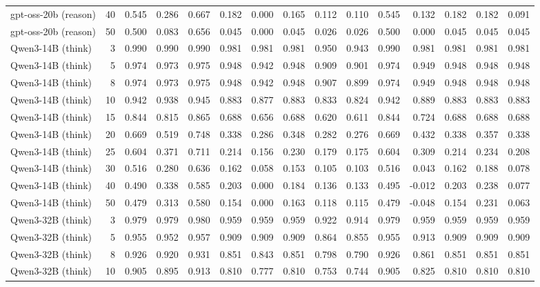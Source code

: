 \documentclass[acmsmall,screen,review,anonymous]{acmart}
\begin{document}
\begin{landscape}
\begin{longtable}{p{4.1cm}r*{13}{r}}
gpt-oss-20b (reason) & 40 & 0.545 & 0.286 & 0.667 & 0.182 & 0.000 & 0.165 & 0.112 & 0.110 & 0.545 & 0.132 & 0.182 & 0.182 & 0.091 \\
gpt-oss-20b (reason) & 50 & 0.500 & 0.083 & 0.656 & 0.045 & 0.000 & 0.045 & 0.026 & 0.026 & 0.500 & 0.000 & 0.045 & 0.045 & 0.045 \\
Qwen3-14B (think) & 3 & 0.990 & 0.990 & 0.990 & 0.981 & 0.981 & 0.981 & 0.950 & 0.943 & 0.990 & 0.981 & 0.981 & 0.981 & 0.981 \\
Qwen3-14B (think) & 5 & 0.974 & 0.973 & 0.975 & 0.948 & 0.942 & 0.948 & 0.909 & 0.901 & 0.974 & 0.949 & 0.948 & 0.948 & 0.948 \\
Qwen3-14B (think) & 8 & 0.974 & 0.973 & 0.975 & 0.948 & 0.942 & 0.948 & 0.907 & 0.899 & 0.974 & 0.949 & 0.948 & 0.948 & 0.948 \\
Qwen3-14B (think) & 10 & 0.942 & 0.938 & 0.945 & 0.883 & 0.877 & 0.883 & 0.833 & 0.824 & 0.942 & 0.889 & 0.883 & 0.883 & 0.883 \\
Qwen3-14B (think) & 15 & 0.844 & 0.815 & 0.865 & 0.688 & 0.656 & 0.688 & 0.620 & 0.611 & 0.844 & 0.724 & 0.688 & 0.688 & 0.688 \\
Qwen3-14B (think) & 20 & 0.669 & 0.519 & 0.748 & 0.338 & 0.286 & 0.348 & 0.282 & 0.276 & 0.669 & 0.432 & 0.338 & 0.357 & 0.338 \\
Qwen3-14B (think) & 25 & 0.604 & 0.371 & 0.711 & 0.214 & 0.156 & 0.230 & 0.179 & 0.175 & 0.604 & 0.309 & 0.214 & 0.234 & 0.208 \\
Qwen3-14B (think) & 30 & 0.516 & 0.280 & 0.636 & 0.162 & 0.058 & 0.153 & 0.105 & 0.103 & 0.516 & 0.043 & 0.162 & 0.188 & 0.078 \\
Qwen3-14B (think) & 40 & 0.490 & 0.338 & 0.585 & 0.203 & 0.000 & 0.184 & 0.136 & 0.133 & 0.495 & -0.012 & 0.203 & 0.238 & 0.077 \\
Qwen3-14B (think) & 50 & 0.479 & 0.313 & 0.580 & 0.154 & 0.000 & 0.163 & 0.118 & 0.115 & 0.479 & -0.048 & 0.154 & 0.231 & 0.063 \\
Qwen3-32B (think) & 3 & 0.979 & 0.979 & 0.980 & 0.959 & 0.959 & 0.959 & 0.922 & 0.914 & 0.979 & 0.959 & 0.959 & 0.959 & 0.959 \\
Qwen3-32B (think) & 5 & 0.955 & 0.952 & 0.957 & 0.909 & 0.909 & 0.909 & 0.864 & 0.855 & 0.955 & 0.913 & 0.909 & 0.909 & 0.909 \\
Qwen3-32B (think) & 8 & 0.926 & 0.920 & 0.931 & 0.851 & 0.843 & 0.851 & 0.798 & 0.790 & 0.926 & 0.861 & 0.851 & 0.851 & 0.851 \\
Qwen3-32B (think) & 10 & 0.905 & 0.895 & 0.913 & 0.810 & 0.777 & 0.810 & 0.753 & 0.744 & 0.905 & 0.825 & 0.810 & 0.810 & 0.810 \\

\end{longtable}
\end{landscape}
\end{document}
